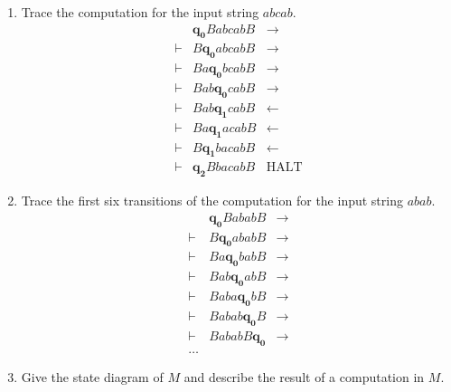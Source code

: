 \documentclass[12pt]{article}
\begin{document}
\begin{enumerate}
\begin{center}
    \end{center}
    \begin{enumerate}
      \item Trace the computation for the input string $abcab$.
        \begin{align*}
          & \bm{q_0}BabcabB & \rightarrow \\
          \vdash & B\bm{\bm{q_0}}abcabB & \rightarrow \\
          \vdash & Ba\bm{q_0}bcabB & \rightarrow \\
          \vdash & Bab\bm{q_0}cabB & \rightarrow \\
          \vdash & Bab\bm{q_1}cabB & \leftarrow \\
          \vdash & Ba\bm{q_1}acabB & \leftarrow \\
          \vdash & B\bm{q_1}bacabB & \leftarrow \\
          \vdash & \bm{q_2}BbacabB & \text{HALT} 
        \end{align*}
      \item Trace the first six transitions of the computation for the input string $abab$.
        \begin{align*}
          & \bm{q_0}BababB & \rightarrow \\
          \vdash & B\bm{\bm{q_0}}ababB & \rightarrow \\
          \vdash & Ba\bm{q_0}babB & \rightarrow \\
          \vdash & Bab\bm{q_0}abB & \rightarrow \\
          \vdash & Baba\bm{q_0}bB & \rightarrow \\
          \vdash & Babab\bm{q_0}B & \rightarrow \\
          \vdash & BababB\bm{q_0} & \rightarrow \\
          \ldots & & 
        \end{align*}
      \item Give the state diagram of $M$ and describe the result of a computation in $M$.
        
        \begin{center}
\end{center}
\end{enumerate}
\end{enumerate}
\end{document}
